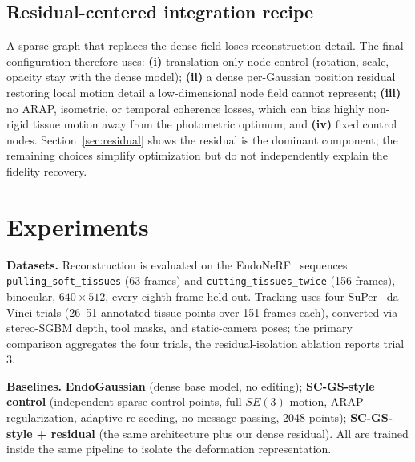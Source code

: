 \documentclass[ASNA,twocolumn]{USG} %
\begin{document}
\subsection{Residual-centered integration recipe}

A sparse graph that replaces the dense field loses reconstruction detail. The final configuration therefore uses: \textbf{(i)} translation-only node control (rotation, scale, opacity stay with the dense model); \textbf{(ii)} a dense per-Gaussian position residual restoring local motion detail a low-dimensional node field cannot represent; \textbf{(iii)} no ARAP, isometric, or temporal coherence losses, which can bias highly non-rigid tissue motion away from the photometric optimum; and \textbf{(iv)} fixed control nodes. Section~\ref{sec:residual} shows the residual is the dominant component; the remaining choices simplify optimization but do not independently explain the fidelity recovery.

\section{Experiments}\label{sec4}

\textbf{Datasets.} Reconstruction is evaluated on the EndoNeRF~\cite{wang2022endonerf} sequences \texttt{pulling\_soft\_tissues} (63 frames) and \texttt{cutting\_tissues\_twice} (156 frames), binocular, $640\times512$, every eighth frame held out. Tracking uses four SuPer~\cite{li2020super} da Vinci trials (26--51 annotated tissue points over 151 frames each), converted via stereo-SGBM depth, tool masks, and static-camera poses; the primary comparison aggregates the four trials, the residual-isolation ablation reports trial 3.

\textbf{Baselines.} \textbf{EndoGaussian} (dense base model, no editing); \textbf{SC-GS-style control} (independent sparse control points, full $SE(3)$ motion, ARAP regularization, adaptive re-seeding, no message passing, 2048 points); \textbf{SC-GS-style + residual} (the same architecture plus our dense residual). All are trained inside the same pipeline to isolate the deformation representation.
\end{document}
